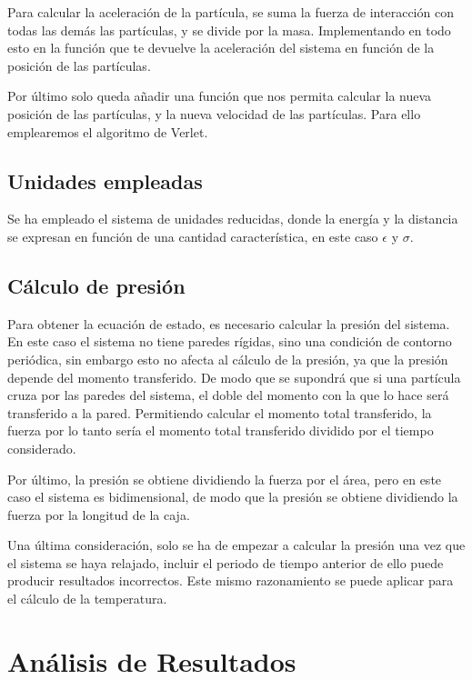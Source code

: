 \documentclass[11pt, twoside]{article} %
\begin{document}
Para calcular la aceleración de la partícula, se suma la fuerza de interacción con
todas las demás las partículas, y se divide por la masa. Implementando en todo esto en la función que te devuelve la aceleración del sistema
en función de la posición de las partículas.

Por último solo queda añadir una función que nos permita calcular la nueva posición
de las partículas, y la nueva velocidad de las partículas. Para ello emplearemos el
algoritmo de Verlet. 

\subsection{Unidades empleadas}

Se ha empleado el sistema de unidades reducidas, donde la energía y la distancia se 
expresan en función de una cantidad característica, en este caso $\epsilon$ y $\sigma$. 


\subsection{Cálculo de presión}

Para obtener la ecuación de estado, es necesario calcular la presión del sistema. 
En este caso el sistema no tiene paredes rígidas, sino una condición de contorno 
periódica, sin embargo esto no afecta al cálculo de la presión, ya que la presión 
depende del momento transferido. De modo que se supondrá que si una partícula cruza
por las paredes del sistema, el doble del momento con la que lo hace será transferido 
a la pared. Permitiendo calcular el momento total transferido, la fuerza por lo tanto
sería el momento total transferido dividido por el tiempo considerado. 

Por último, la presión se obtiene dividiendo la fuerza por el área, pero en este caso
el sistema es bidimensional, de modo que la presión se obtiene dividiendo la fuerza
por la longitud de la caja.

Una última consideración, solo se ha de empezar a calcular la presión una vez que el
sistema se haya relajado, incluir el periodo de tiempo anterior de ello puede producir
resultados incorrectos. Este mismo razonamiento se puede aplicar para el cálculo de
la temperatura.

\newpage

\section{Análisis de Resultados}
\end{document}
